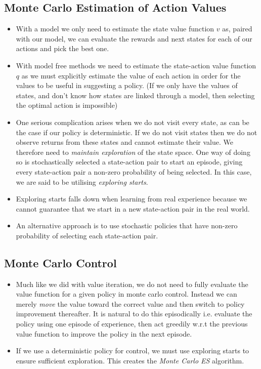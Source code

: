 \subsection{Monte Carlo Estimation of Action Values}
\begin{itemize}
\item With a model we only need to estimate the state value function \(v\) as, paired with our model, we can evaluate the rewards and next states for each of our actions and pick the best one.
\item With model free methods we need to estimate the state-action value function \(q\) as we must explicitly estimate the value of each action in order for the values to be useful in suggesting a policy. (If we only have the values of states, and don't know how states are linked through a model, then selecting the optimal action is impossible)
\item One serious complication arises when we do not visit every state, as can be the case if our policy is deterministic. If we do not visit states then we do not observe returns from these states and cannot estimate their value. We therefore need to \textit{maintain exploration} of the state space. One way of doing so is stochastically selected a state-action pair to start an episode, giving every state-action pair a non-zero probability of being selected. In this case, we are said to be utilising \textit{exploring starts}.
\item Exploring starts falls down when learning from real experience because we cannot guarantee that we start in a new state-action pair in the real world. 
\item An alternative approach is to use stochastic policies that have non-zero probability of selecting each state-action pair.
\end{itemize}


\subsection{Monte Carlo Control}
\begin{itemize}
\item Much like we did with value iteration, we do not need to fully evaluate the value function for a given policy in monte carlo control. Instead we can merely \textit{move} the value toward the correct value and then switch to policy improvement thereafter. It is natural to do this episodically i.e. evaluate the policy using one episode of experience, then act greedily w.r.t the previous value function to improve the policy in the next episode.
\item If we use a deterministic policy for control, we must use exploring starts to ensure sufficient exploration. This creates the \textit{Monte Carlo ES} algorithm.
\end{itemize}

